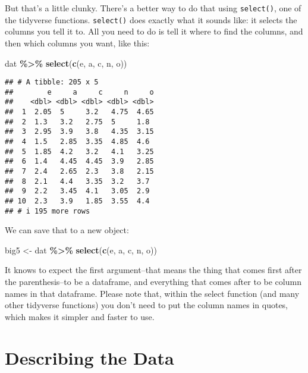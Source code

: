 \documentclass[
]{article}
\newenvironment{Shaded}{\begin{snugshade}}{\end{snugshade}}
\newcommand{\FunctionTok}[1]{\textcolor[rgb]{0.13,0.29,0.53}{\textbf{#1}}}
\newcommand{\NormalTok}[1]{#1}
\newcommand{\OtherTok}[1]{\textcolor[rgb]{0.56,0.35,0.01}{#1}}
\newcommand{\SpecialCharTok}[1]{\textcolor[rgb]{0.81,0.36,0.00}{\textbf{#1}}}
\begin{document}
But that's a little clunky. There's a better way to do that using
\texttt{select()}, one of the tidyverse functions. \texttt{select()}
does exactly what it sounds like: it selects the columns you tell it to.
All you need to do is tell it where to find the columns, and then which
columns you want, like this:

\begin{Shaded}
\begin{Highlighting}[]
\NormalTok{dat }\SpecialCharTok{\%\textgreater{}\%} 
  \FunctionTok{select}\NormalTok{(}\FunctionTok{c}\NormalTok{(e, a, c, n, o))}
\end{Highlighting}
\end{Shaded}

\begin{verbatim}
## # A tibble: 205 x 5
##        e     a     c     n     o
##    <dbl> <dbl> <dbl> <dbl> <dbl>
##  1  2.05  5     3.2   4.75  4.65
##  2  1.3   3.2   2.75  5     1.8 
##  3  2.95  3.9   3.8   4.35  3.15
##  4  1.5   2.85  3.35  4.85  4.6 
##  5  1.85  4.2   3.2   4.1   3.25
##  6  1.4   4.45  4.45  3.9   2.85
##  7  2.4   2.65  2.3   3.8   2.15
##  8  2.1   4.4   3.35  3.2   3.7 
##  9  2.2   3.45  4.1   3.05  2.9 
## 10  2.3   3.9   1.85  3.55  4.4 
## # i 195 more rows
\end{verbatim}

We can save that to a new object:

\begin{Shaded}
\begin{Highlighting}[]
\NormalTok{big5 }\OtherTok{\textless{}{-}}\NormalTok{ dat }\SpecialCharTok{\%\textgreater{}\%} 
  \FunctionTok{select}\NormalTok{(}\FunctionTok{c}\NormalTok{(e, a, c, n, o))}
\end{Highlighting}
\end{Shaded}

It knows to expect the first argument--that means the thing that comes
first after the parenthesis--to be a dataframe, and everything that
comes after to be column names in that dataframe. Please note that,
within the select function (and many other tidyverse functions) you
don't need to put the column names in quotes, which makes it simpler and
faster to use.

\hypertarget{describing-the-data}{%
\section{Describing the Data}\label{describing-the-data}}
\end{document}
